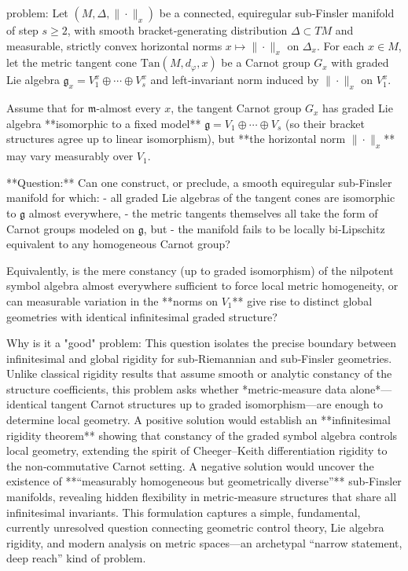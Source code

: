 problem:  
Let \( (M, \Delta, \|\cdot\|_x) \) be a connected, equiregular sub‑Finsler manifold of step \(s\ge2\), with smooth bracket‑generating distribution \( \Delta\subset TM \) and measurable, strictly convex horizontal norms \(x\mapsto \|\cdot\|_x\) on \(\Delta_x\).  
For each \(x\in M\), let the metric tangent cone \(\mathrm{Tan}(M,d_\varphi,x)\) be a Carnot group \(G_x\) with graded Lie algebra \(\mathfrak g_x=V^x_1\oplus\cdots\oplus V^x_s\) and left‑invariant norm induced by \(\|\cdot\|_x\) on \(V^x_1\).

Assume that for \(\mathfrak m\)-almost every \(x\), the tangent Carnot group \(G_x\) has graded Lie algebra **isomorphic to a fixed model** \(\mathfrak g=V_1\oplus\cdots\oplus V_s\) (so their bracket structures agree up to linear isomorphism), but **the horizontal norm \(\|\cdot\|_x\)** may vary measurably over \(V_1\).  

**Question:**  
Can one construct, or preclude, a smooth equiregular sub‑Finsler manifold for which:  
- all graded Lie algebras of the tangent cones are isomorphic to \(\mathfrak g\) almost everywhere,  
- the metric tangents themselves all take the form of Carnot groups modeled on \(\mathfrak g\), but  
- the manifold fails to be locally bi‑Lipschitz equivalent to any homogeneous Carnot group?  

Equivalently, is the mere constancy (up to graded isomorphism) of the nilpotent symbol algebra almost everywhere sufficient to force local metric homogeneity, or can measurable variation in the **norms on \(V_1\)** give rise to distinct global geometries with identical infinitesimal graded structure?

Why is it a "good" problem:  
This question isolates the precise boundary between infinitesimal and global rigidity for sub‑Riemannian and sub‑Finsler geometries.  
Unlike classical rigidity results that assume smooth or analytic constancy of the structure coefficients, this problem asks whether *metric‑measure data alone*—identical tangent Carnot structures up to graded isomorphism—are enough to determine local geometry.  
A positive solution would establish an **infinitesimal rigidity theorem** showing that constancy of the graded symbol algebra controls local geometry, extending the spirit of Cheeger–Keith differentiation rigidity to the non‑commutative Carnot setting.  
A negative solution would uncover the existence of **“measurably homogeneous but geometrically diverse”** sub‑Finsler manifolds, revealing hidden flexibility in metric‑measure structures that share all infinitesimal invariants.  
This formulation captures a simple, fundamental, currently unresolved question connecting geometric control theory, Lie algebra rigidity, and modern analysis on metric spaces—an archetypal “narrow statement, deep reach” kind of problem.